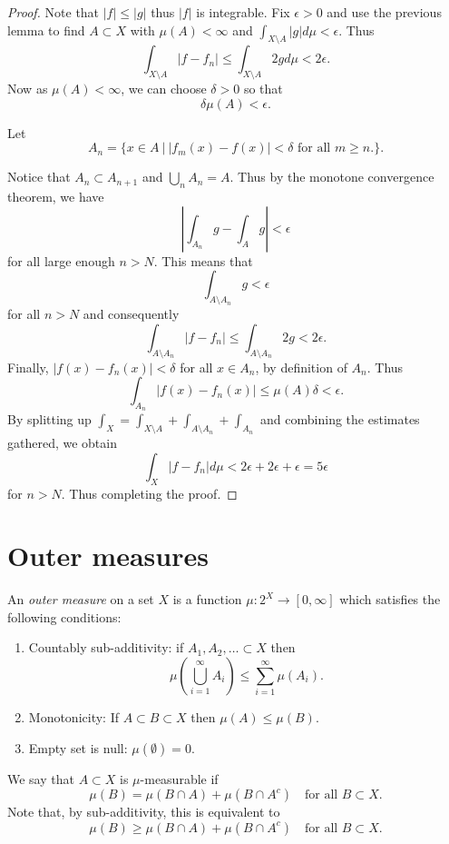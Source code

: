 \documentclass[twoside, a4paper, 10pt]{amsart}
\begin{document}
\begin{proof} Note that $|f| \leq |g|$ thus $|f|$ is integrable. Fix $\epsilon>0$ and use the previous lemma to find $A \subset X$ with $\mu(A)<\infty$ and $\int_{X \setminus A} |g|d\mu < \epsilon$. Thus $$\int_{X \setminus A} |f - f_n| \leq \int_{X \setminus A} 2g d\mu < 2\epsilon.$$ Now as $\mu(A)<\infty$, we can choose $\delta >0$ so that $$\delta \mu(A) < \epsilon.$$ 

Let $$A_n = \{ x \in A ~|~ |f_m(x) - f(x)| < \delta \text{ for all } m \geq n. \}.$$

Notice that $A_n \subset A_{n+1}$ and $\bigcup_n A_n = A$. Thus by the monotone convergence theorem, we have $$|\int_{A_n} g - \int_{A} g| < \epsilon$$ for all large enough $n > N$. This means that $$\int_{A \setminus A_n} g < \epsilon$$ for all $n>N$ and consequently $$\int_{A \setminus A_n} |f - f_n| \leq \int_{A \setminus A_n} 2g < 2\epsilon .$$ Finally, $|f(x) - f_n(x)| < \delta$ for all $x \in A_n$, by definition of $A_n$. Thus $$\int_{A_n} |f(x) - f_n(x)| \leq \mu(A) \delta <\epsilon.$$ By splitting up $\int_X = \int_{X\setminus A} + \int_{A \setminus A_n} + \int_{A_n}$ and combining the estimates gathered, we obtain $$\int_X |f - f_n| d\mu < 2\epsilon + 2\epsilon + \epsilon = 5 \epsilon$$ for $n>N$. Thus completing the proof. \end{proof}

\section{Outer measures}

\begin{mydef} An \textit{outer measure} on a set $X$ is a function $\mu:2^X \to [0,\infty]$ which satisfies the following conditions:

\begin{enumerate}
	\item Countably sub-additivity: if $A_1,A_2,\ldots \subset X$ then $$\mu(\bigcup_{i=1}^{\infty} A_i) \leq \sum_{i=1}^{\infty} \mu(A_i).$$
	\item Monotonicity: If $A \subset B \subset X$ then $\mu(A) \leq \mu(B)$.
	\item Empty set is null: $\mu(\emptyset) = 0$.
\end{enumerate}

We say that $A \subset X$ is $\mu$-measurable if $$\mu(B) = \mu(B \cap A) + \mu(B \cap A^c) \quad \text{for all } B \subset X.$$ Note that, by sub-additivity, this is equivalent to $$\mu(B) \geq \mu(B \cap A) + \mu(B \cap A^c) \quad \text{for all } B \subset X.$$

\end{mydef}
\end{document}
